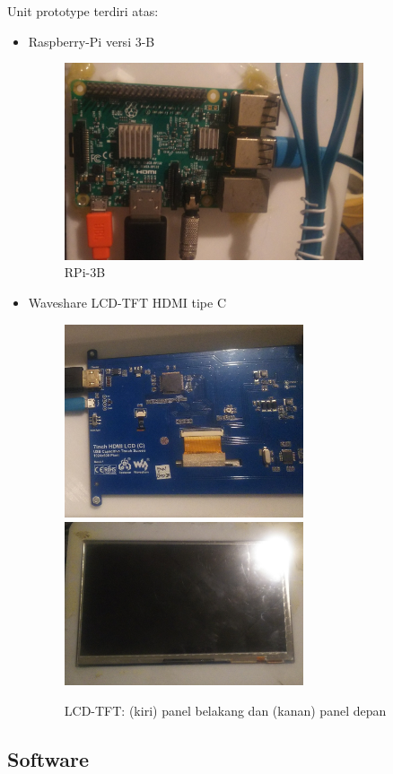 \documentclass[12pt,]{article}
\begin{document}
	Unit prototype terdiri atas:
	\begin{itemize}
		\item Raspberry-Pi versi 3-B
		\begin{figure}[!ht]
			\centering
			\includegraphics[width=250pt]{images/foto/raspi}
			\caption{RPi-3B}
		\end{figure}
		\item Waveshare LCD-TFT HDMI tipe C
		\begin{figure}[!ht]
			\centering
			\includegraphics[width=200pt]{images/foto/lcd_back}
			\includegraphics[width=200pt]{images/foto/lcd_front}
			\caption{LCD-TFT: (kiri) panel belakang dan (kanan) panel depan}
		\end{figure}
	\end{itemize}
	
	\newpage
	\subsection{Software}
	
\end{document}
